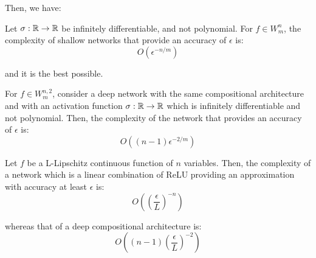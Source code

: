 Then, we have:

\begin{theorem}
    Let $\sigma: \mathbb{R} \to \mathbb{R}$ be infinitely differentiable, and not polynomial. For $f \in W_m^{n}$, the 
    complexity of shallow networks that provide an accuracy of $\epsilon$ is:
    $$O(\epsilon^{-n/m})$$

    and it is the best possible.
\end{theorem}

\begin{theorem}
    For $f \in W_m^{n,2}$, consider a deep network with the same compositional architecture and with an 
    activation function $\sigma: \mathbb{R} \to \mathbb{R}$ which is infinitely differentiable and not polynomial. Then, the
    complexity of the network that provides an accuracy of $\epsilon$ is:
    $$O((n-1) \epsilon^{-2/m})$$ 
\end{theorem}

\begin{theorem}
    Let $f$ be a L-Lipschitz continuous function of $n$ variables. Then, the complexity of a network which is 
    a linear combination of ReLU providing an approximation with accuracy at least $\epsilon$ is:
    $$O\left(\left(\frac{\epsilon}{L}\right)^{-n}\right)$$

    whereas that of a deep compositional architecture is:
    $$O\left((n-1)\left(\frac{\epsilon}{L}\right)^{-2}\right)$$
\end{theorem}






